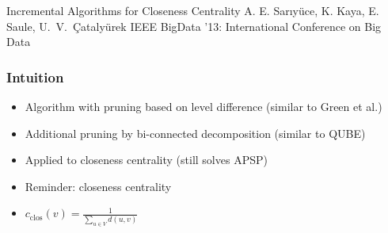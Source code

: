 \begin{frame}
  \centering
  \vfill
  {\huge Incremental Algorithms for Closeness Centrality}
  \vfill
  {\Large A. E. Sar\i y\"uce, K. Kaya, E. Saule, U.~V.~\c{C}ataly\"urek }
  \vfill
  {\large IEEE BigData '13: International Conference on Big Data}
  \vfill
\end{frame}


\begin{frame}
  \frametitle{Intuition}

  \begin{itemize}
    \item Algorithm with pruning based on level difference (similar to Green et al.)
    \item Additional pruning by bi-connected decomposition (similar to QUBE)
    \item Applied to closeness centrality (still solves APSP)
    \item Reminder: closeness centrality
    \item $\displaystyle c_{\mathrm{clos}}(v)=\frac{1}{\displaystyle  \sum_{u \in V} d(u,v)}$
  \end{itemize}

\end{frame}


